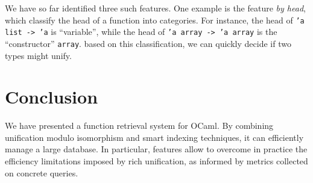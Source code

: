 \documentclass [a4paper,11pt]{scrartcl}
\begin{document}
\medskip
We have so far identified three such features. One example is the feature
\emph{by head}, which classify the head of a function into categories.
For instance, the head of \texttt{'a list -> 'a} is ``variable'',
while the head of \texttt{'a array -> 'a array} is the ``constructor''
\texttt{array}.
based on this classification, we can quickly
decide if two types might unify.






\section{Conclusion}

We have presented a function retrieval system for OCaml. By combining unification modulo isomorphism and smart indexing techniques, it can efficiently manage a large database. In particular, features allow to overcome in practice the
efficiency limitations imposed by rich unification, as informed
by metrics collected on concrete queries.



\printbibliography
\end{document}

